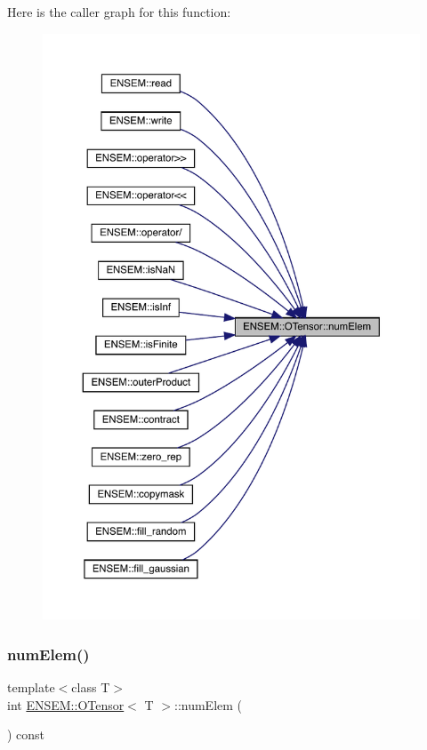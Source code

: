 Here is the caller graph for this function\+:\nopagebreak
\begin{figure}[H]
\begin{center}
\leavevmode
\includegraphics[width=350pt]{da/d8a/classENSEM_1_1OTensor_a30a241a5b4f16fab55fd70ffee52828a_icgraph}
\end{center}
\end{figure}
\mbox{\label{classENSEM_1_1OTensor_a30a241a5b4f16fab55fd70ffee52828a}} 
\subsubsection{\texorpdfstring{numElem()}{numElem()}\hspace{0.1cm}{\footnotesize\ttfamily [2/2]}}
{\footnotesize\ttfamily template$<$class T$>$ \\
int \mbox{\hyperlink{classENSEM_1_1OTensor}{E\+N\+S\+E\+M\+::\+O\+Tensor}}$<$ T $>$\+::num\+Elem (\begin{DoxyParamCaption}{ }\end{DoxyParamCaption}) const\hspace{0.3cm}{\ttfamily [inline]}}



